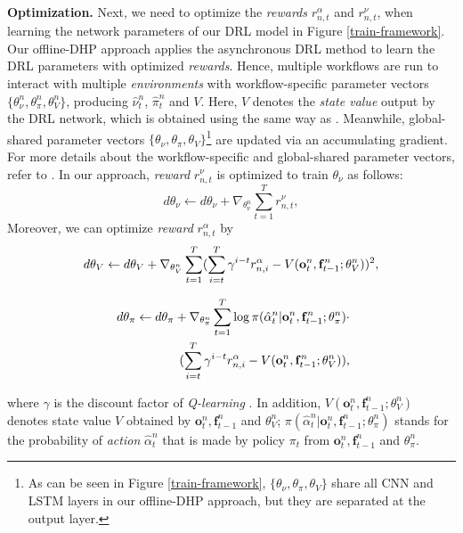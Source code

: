 \documentclass[10pt,journal,compsoc]{IEEEtran}
\begin{document}
\textbf{Optimization.}
Next, we need to optimize the \textit{rewards} $r^{\alpha}_{n,t}$ and $r^{\nu}_{n,t}$, when learning the network parameters of our DRL model in Figure \ref{train-framework}.
Our offline-DHP approach applies the asynchronous DRL method \cite{mnih2016asynchronous} to learn the DRL parameters with optimized \textit{rewards}.
Hence, multiple workflows are run to interact with multiple \textit{environments} with workflow-specific parameter vectors $\{ \theta^{n}_{\nu}, \theta^{n}_{\pi}, \theta^{n}_{V} \}$, producing $\hat{\nu}^n_t$, $\hat{\pi}^n_t$ and $V$.
Here, $V$ denotes the \textit{state value} output by the DRL network, which is obtained using the same way as \cite{mnih2016asynchronous}.
Meanwhile, global-shared parameter vectors $\{ \theta_{\nu}, \theta_{\pi}, \theta_{V} \}$\footnote{As can be seen in Figure \ref{train-framework}, $\{ \theta_{\nu}, \theta_{\pi}, \theta_{V} \}$ share all CNN and LSTM layers in our offline-DHP approach, but they are separated at the output layer.} are updated via an accumulating gradient.
For more details about the workflow-specific and global-shared parameter vectors, refer to \cite{mnih2016asynchronous}.
In our approach, \textit{reward} $r^{\nu}_{n,t}$ is optimized to train $\theta_{\nu}$ as follows:
\begin{equation}
\label{opt-1}
d \theta_{\nu} \leftarrow d \theta_{\nu} + \nabla_{\theta_{\nu}^{n}} \sum_{t=1}^{T} r^{\nu}_{n,t},
\end{equation}
Moreover, we can optimize \textit{reward} $r^{\alpha}_{n,t}$ by
\begin{equation}
\label{opt-2}
\small d \theta_{V} \leftarrow d \theta_{V} + \nabla_{\theta_{V}^{n}} \sum_{t = 1}^{T} (\sum_{i=t}^{T} \gamma^{i-t} r^{\alpha}_{n,i} - V(\mathbf{o}^n_{t}, \mathbf{f}^n_{t-1} ; \theta_{V}^{n}))^2,
\end{equation}
\begin{small}
\begin{eqnarray}
\label{opt-3}
\hspace{0.1cm} \nonumber d \theta_{\pi} \leftarrow d \theta_{\pi} +\nabla_{\theta_{\pi}^{n}} \sum_{t = 1}^{T} \log \pi( \hat{\alpha}^n_{t} | \mathbf{o}^n_{t}, \mathbf{f}^n_{t-1} ; \theta_{\pi}^{n})\cdot \\
(\sum_{i = t}^{T} \gamma^{i-t} r^{\alpha}_{n,i} - V(\mathbf{o}^n_{t}, \mathbf{f}^n_{t-1} ; \theta_{V}^{n})),
\end{eqnarray}
\end{small}
where $\gamma$ is the discount factor of \textit{Q-learning} \cite{watkins1992q}.
In addition, $V(\mathbf{o}^n_{t}, \mathbf{f}^n_{t-1} ; \theta_{V}^{n})$ denotes state value $V$ obtained by $\mathbf{o}^n_{t}, \mathbf{f}^n_{t-1}$ and $\theta_{V}^{n}$; $\pi( \hat{\alpha}^n_{t} | \mathbf{o}^n_{t}, \mathbf{f}^n_{t-1} ; \theta_{\pi}^{n})$ stands for the probability of \textit{action} $\hat{\alpha}^n_{t}$ that is made by policy $\pi_t$ from $\mathbf{o}^n_{t}, \mathbf{f}^n_{t-1}$ and $\theta_{\pi}^{n}$.
\end{document}
